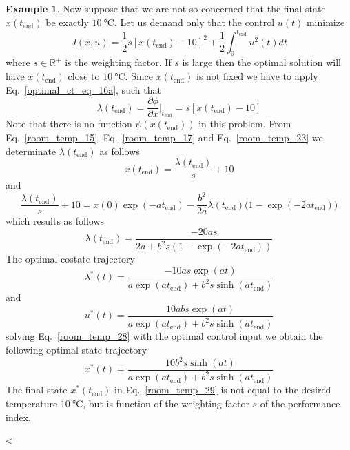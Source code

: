 \documentclass[11pt,a4paper,oneside]{book}
\numberwithin{equation}{section}
\theoremstyle{it}
\theoremstyle{definition}
\newtheorem{example}{Example}[chapter]
\begin{document}
\begin{example}
	Now suppose that we are not so concerned that the final state 
	$x(t_\text{end})$ be exactly $\SI{10}{\celsius}$. Let us demand only that 
	the control $u(t)$ 
	minimize
	\begin{equation}\label{room_temp_22}
		J(x,u)=\frac{1}{2}s[x(t_\text{end})-10]^2+\frac{1}{2} 
		\int_{0}^{t_\text{end}}u^2(t)dt
	\end{equation}
	where $s\in\mathbb{R}^+$ is the weighting factor. If $s$ is large then the 
	optimal solution will have $x(t_\text{end})$ close to $\SI{10}{\celsius}$. 
	Since $x(t_\text{end})$ is not fixed we have to apply 
	Eq.~\ref{optimal_ct_eq_16a}, such that
	\begin{equation}\label{room_temp_23}
		\lambda(t_\text{end})=\frac{\partial \phi}{\partial 
			x}\Big|_{t_\text{end}}=s[x(t_\text{end})-10]
	\end{equation}
	Note that there is no function $\psi(x(t_\text{end}))$ in this problem. 
	From Eq.~\eqref{room_temp_15}, Eq.~\eqref{room_temp_17} and 
	Eq.~\eqref{room_temp_23} we determinate $\lambda(t_\text{end})$ as follows
	\begin{equation}\label{room_temp_24}
		x(t_\text{end}) = \frac{\lambda(t_\text{end})}{s}+10
	\end{equation}
	and 
	\begin{equation}\label{room_temp_25}
		\frac{\lambda(t_\text{end})}{s}+10 = 
		x(0)\exp(-at_\text{end})-\frac{b^2}{2a}\lambda(t_\text{end}) 
		\Big(1-\exp(-2at_\text{end})\Big)
	\end{equation}
	which results as follows
	\begin{equation}\label{room_temp_26}
		\lambda(t_\text{end})=\frac{-20as}{2a+b^2s(1-\exp(-2at_\text{end}))}
	\end{equation}
	The optimal costate trajectory 
	\begin{equation}\label{room_temp_27}
		\lambda^*(t) = \frac{-10as\exp(at)}{a\exp(at_\text{end})+ 
			b^2s\sinh(at_\text{end})}
	\end{equation}
	and 
	\begin{equation}\label{room_temp_28}
		u^*(t) = 
		\frac{10abs\exp(at)}{a\exp(at_\text{end})+b^2s\sinh(at_\text{end})}
	\end{equation}
	solving Eq.~\eqref{room_temp_28} with the optimal control input we obtain 
	the following optimal state trajectory 
	\begin{equation}\label{room_temp_29}
		x^*(t) = \frac{10b^2s\sinh(at)}{a\exp(at_\text{end}) 
			+b^2s\sinh(at_\text{end})}
	\end{equation}
	The final state $x^*(t_\text{end})$ in Eq.~\eqref{room_temp_29} is not 
	equal to the desired temperature $\SI{10}{\celsius}$, but is function of 
	the weighting factor $s$ of the performance index.
	
	$\triangleleft$ 
\end{example}
\end{document}
